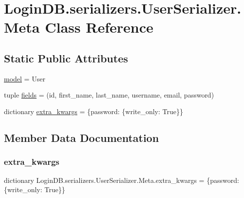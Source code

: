 \hypertarget{class_login_d_b_1_1serializers_1_1_user_serializer_1_1_meta}{}\section{Login\+D\+B.\+serializers.\+User\+Serializer.\+Meta Class Reference}
\label{class_login_d_b_1_1serializers_1_1_user_serializer_1_1_meta}
\subsection*{Static Public Attributes}
\begin{DoxyCompactItemize}
\item 
\hyperlink{class_login_d_b_1_1serializers_1_1_user_serializer_1_1_meta_af6215e02a79a771e88120b9805c2a2e2}{model} = User
\item 
tuple \hyperlink{class_login_d_b_1_1serializers_1_1_user_serializer_1_1_meta_a3d432ea1e86bb22095126037e141d797}{fields} = (\textquotesingle{}id\textquotesingle{}, \textquotesingle{}first\+\_\+name\textquotesingle{}, \textquotesingle{}last\+\_\+name\textquotesingle{}, \textquotesingle{}username\textquotesingle{}, \textquotesingle{}email\textquotesingle{}, \textquotesingle{}password\textquotesingle{})
\item 
dictionary \hyperlink{class_login_d_b_1_1serializers_1_1_user_serializer_1_1_meta_a98ed32b1f68ebc34b8f012cd6f579c9e}{extra\+\_\+kwargs} = \{\textquotesingle{}password\textquotesingle{}\+: \{\textquotesingle{}write\+\_\+only\textquotesingle{}\+: True\}\}
\end{DoxyCompactItemize}


\subsection{Member Data Documentation}
\mbox{\label{class_login_d_b_1_1serializers_1_1_user_serializer_1_1_meta_a98ed32b1f68ebc34b8f012cd6f579c9e}} 
\subsubsection{\texorpdfstring{extra\+\_\+kwargs}{extra\_kwargs}}
{\footnotesize\ttfamily dictionary Login\+D\+B.\+serializers.\+User\+Serializer.\+Meta.\+extra\+\_\+kwargs = \{\textquotesingle{}password\textquotesingle{}\+: \{\textquotesingle{}write\+\_\+only\textquotesingle{}\+: True\}\}\hspace{0.3cm}{\ttfamily [static]}}

